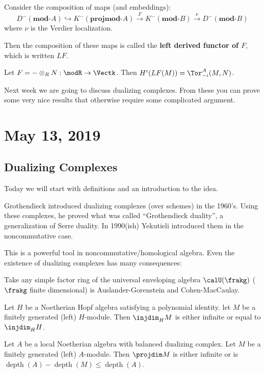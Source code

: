 \documentclass[12pt]{article}
\begin{document}
Consider the composition of maps (and embeddings):
\[D^-(\mathbf{mod}\text{-}A)\hookrightarrow K^-(\mathbf{projmod}\text{-}A)\xrightarrow{F} K^-(\mathbf{mod}\text{-}B)\xrightarrow{\nu} D^-(\mathbf{mod}\text{-}B)\]
where $\nu$ is the Verdier localization.

Then the composition of these maps is called the \textbf{left derived functor of $F$}, which is written $LF$.
\begin{ex}
	Let $F=-\otimes_R N:\modR\to\Vectk$. Then $H^i(LF(M))=\Tor_{-i}^A(M,N)$.
\end{ex}
Next week we are going to discuss dualizing complexes. From these you can prove some very nice results 
that otherwise require some complicated argument.

\section{May 13, 2019}
\subsection{Dualizing Complexes}
Today we will start with definitions and an introduction to the idea.

Grothendieck introduced dualizing complexes (over schemes) in the 1960's. Using these complexes, 
he proved what was called ``Grothendieck duality'', a generalization of Serre duality. In 1990(ish)
Yekutieli introduced them in the noncommutative case.

This is a powerful tool in noncommutative/homological algebra. Even the existence of dualizing 
complexes has many consequences:
\begin{thm}
	Take any simple factor ring of the universal enveloping algebra $\calU(\frakg)$ ($\frakg$ finite dimensional) is Auslander-Gorenstein and Cohen-MacCaulay.
\end{thm}
\begin{thm}
	Let $H$ be a Noetherian Hopf algebra satisfying a polynomial identity. let $M$ be a finitely generated (left) $H$-module.
	Then $\injdim_H M$ is either infinite or equal to $\injdim_H H$.
\end{thm}
\begin{thm}
	Let $A$ be a local Noetherian algebra with balanced dualizing complex. Let $M$ be a finitely generated (left) $A$-module.
	Then $\projdim M$ is either infinite or is $\operatorname{depth}(A)-\operatorname{depth}(M)\le \operatorname{depth}(A)$.
\end{thm}
\end{document}
